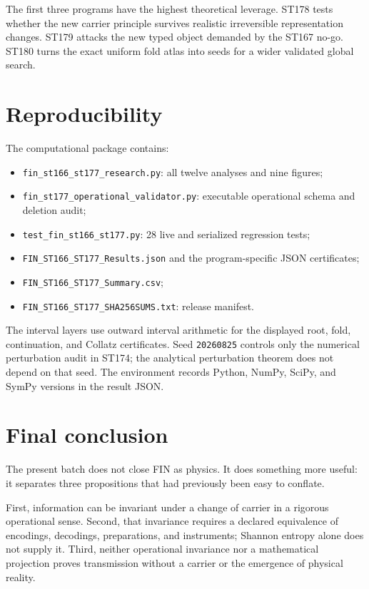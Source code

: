 \documentclass[11pt,a4paper]{article}
\begin{document}
The first three programs have the highest theoretical leverage. ST178 tests whether the new carrier principle survives realistic irreversible representation changes. ST179 attacks the new typed object demanded by the ST167 no-go. ST180 turns the exact uniform fold atlas into seeds for a wider validated global search.

\section{Reproducibility}

The computational package contains:
\begin{itemize}
\item \texttt{fin\_st166\_st177\_research.py}: all twelve analyses and nine figures;
\item \texttt{fin\_st177\_operational\_validator.py}: executable operational schema and deletion audit;
\item \texttt{test\_fin\_st166\_st177.py}: 28 live and serialized regression tests;
\item \texttt{FIN\_ST166\_ST177\_Results.json} and the program-specific JSON certificates;
\item \texttt{FIN\_ST166\_ST177\_Summary.csv};
\item \texttt{FIN\_ST166\_ST177\_SHA256SUMS.txt}: release manifest.
\end{itemize}

The interval layers use outward interval arithmetic for the displayed root, fold, continuation, and Collatz certificates. Seed \texttt{20260825} controls only the numerical perturbation audit in ST174; the analytical perturbation theorem does not depend on that seed. The environment records Python, NumPy, SciPy, and SymPy versions in the result JSON.

\section{Final conclusion}

The present batch does not close FIN as physics. It does something more useful: it separates three propositions that had previously been easy to conflate.

First, information can be invariant under a change of carrier in a rigorous operational sense. Second, that invariance requires a declared equivalence of encodings, decodings, preparations, and instruments; Shannon entropy alone does not supply it. Third, neither operational invariance nor a mathematical projection proves transmission without a carrier or the emergence of physical reality.
\end{document}
